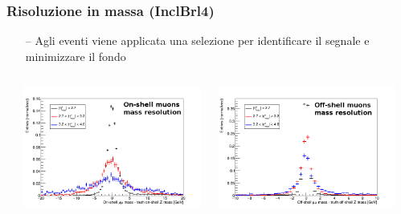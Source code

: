 \documentclass{beamer}
\begin{document}
\begin{frame}
\frametitle{Risoluzione in massa (InclBrl4)}
\begin{itemize}
\item[\color{black}--] Agli eventi viene applicata una selezione per identificare il segnale e minimizzare il fondo 
\end{itemize}

\begin{columns}
\begin{column}{0.09\textwidth}
\end{column}
\begin{column}{0.41\textwidth}
\includegraphics[width=\textwidth]{HZZ4mu/sigRecoOnShellMass2}
\end{column}
\begin{column}{0.41\textwidth}
\includegraphics[width=\textwidth]{HZZ4mu/sigRecoOffShellMass2}
\end{column}
\begin{column}{0.09\textwidth}
\end{column}
\end{columns}
\vskip-0.1cm


\end{frame}
\end{document}

